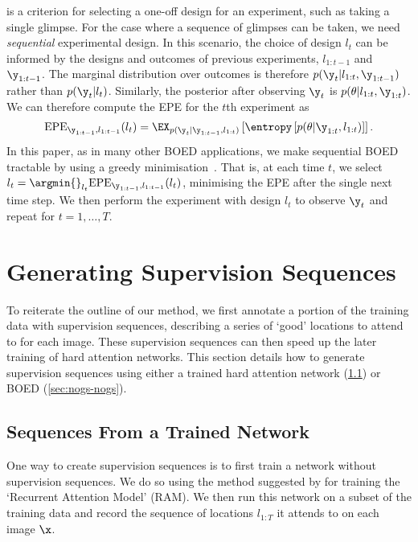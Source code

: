  is a criterion for selecting a one-off design for an experiment,
such as taking a single glimpse. For the case where a sequence of glimpses can
be taken, we need \textit{sequential} experimental design. In this scenario, the
choice of design $l_t$ can be informed by the designs and outcomes of previous
experiments, $l_{1:t-1}$ and $\y_{1:t-1}$. The marginal distribution over
outcomes is therefore $p(\y_t|l_{1:t},\y_{1:t-1})$ rather than $p(\y_t|l_t)$.
Similarly, the posterior after observing $\y_t$ is $p(\theta|l_{1:t},\y_{1:t})$.
%
We can therefore compute the EPE for the $t$th experiment as
%
\begin{align}
  \label{eq:seq-epe}
  \text{EPE}_{\y_{1:t-1}, l_{1:t-1}} (l_t) = \EX_{p(\y_t | \y_{1:t-1}, l_{1:t})} \left[\entropy \left[ p(\theta | \y_{1:t}, l_{1:t} ) \right]  \right].
\end{align}
In this paper, as in many other BOED applications, we make sequential BOED
tractable by using a greedy minimisation~\cite{foster2019variational}. That is,
at each time $t$, we select
$l_t = \argmin{}_{l_t} \text{EPE}_{\y_{1:t-1}, l_{1:t-1}} (l_t)$, minimising the
EPE after the single next time step. We then perform the experiment with design
$l_t$ to observe $\y_t$ and repeat for $t=1,\ldots,T$.

\section{Generating Supervision Sequences} \label{sec:nogs-generating-seqs} To
reiterate the outline of our method, we first annotate a portion of the training
data with supervision sequences, describing a series of `good' locations to
attend to for each image. These supervision sequences can then speed up the
later training of hard attention networks. This section details how to generate
supervision sequences using either a trained hard attention network
(\cref{sec:nogs-rams}) or BOED (\cref{sec:nogs-nogs}).

\subsection{Sequences From a Trained Network} \label{sec:nogs-rams} One way to create
supervision sequences is to first train a network without supervision sequences.
We do so using the method suggested by \cite{mnih2014recurrent} for training the
`Recurrent Attention Model' (RAM). We then run this network on a subset of the
training data and record the sequence of locations $l_{1:T}$ it attends to on
each image $\x$.

